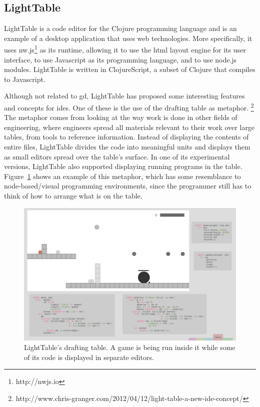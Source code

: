 \subsection{LightTable}
\label{lighttable:related}
LightTable\cite{lighttable2015site} is a code editor for the Clojure programming language\cite{hickey2008clojure} and is an example of a desktop application that uses web technologies.
More specifically, it uses nw.js\footnote{http://nwjs.io} as its runtime, allowing it to use the html layout engine for its user interface, to use Javascript as its programming language, and to use node.js\cite{tilkov2010node} modules.
LightTable is written in ClojureScript\cite{10.1109/MIC.2011.148}, a subset of Clojure that compiles to Javascript.

Although not related to \gls{gd}, LightTable has proposed some interesting features and concepts for \glspl{ide}.
One of these is the use of the drafting table as metaphor.%
\footnote{http://www.chris-granger.com/2012/04/12/light-table-a-new-ide-concept/}
The metaphor comes from looking at the way work is done in other fields of engineering, where engineers spread all materials relevant to their work over large tables, from tools to reference information.
Instead of displaying the contents of entire files, LightTable divides the code into meaningful units and displays them as small editors spread over the table's surface.
In one of its experimental versions, LightTable also supported displaying running programs in the table.
Figure~\ref{fig:lt:draft:table} shows an example of this metaphor, which has some resemblance to node-based/visual programming environments, since the programmer still has to think of how to arrange what is on the table.

\begin{figure}
  \centering
  \includegraphics[width=12cm]{./images/lt_game_example__inv}
  \caption[LightTable's drafting table showing a game.]{LightTable's drafting table. A game is being run inside it while some of its code is displayed in separate editors.}
  \label{fig:lt:draft:table}
\end{figure}


